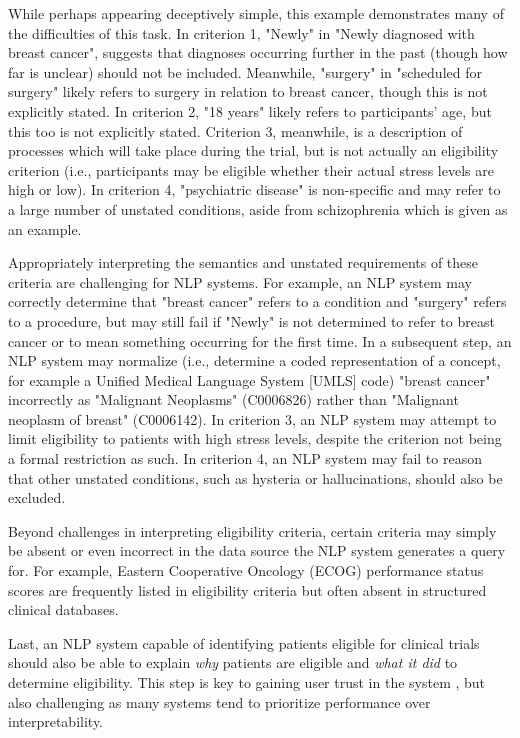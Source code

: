 \documentclass[../main.tex]{subfiles}
\begin{document}
\noindent While perhaps appearing deceptively simple, this example demonstrates many of the difficulties of this task. In criterion 1,  "Newly" in "Newly diagnosed with breast cancer", suggests that diagnoses occurring further in the past (though how far is unclear) should not be included. Meanwhile, "surgery" in "scheduled for surgery" likely refers to surgery in relation to breast cancer, though this is not explicitly stated. In criterion 2, "18 years" likely refers to participants' age, but this too is not explicitly stated. Criterion 3, meanwhile, is a description of processes which will take place during the trial, but is not actually an eligibility criterion (i.e., participants may be eligible whether their actual stress levels are high or low). In criterion 4, "psychiatric disease" is non-specific and may refer to a large number of unstated conditions, aside from schizophrenia which is given as an example.

Appropriately interpreting the semantics and unstated requirements of these criteria are challenging for NLP systems. For example, an NLP system may correctly determine that "breast cancer" refers to a condition and "surgery" refers to a procedure, but may still fail if "Newly" is not determined to refer to breast cancer or to mean something occurring for the first time. In a subsequent step, an NLP system may normalize (i.e., determine a coded representation of a concept, for example a Unified Medical Language System [UMLS] code) "breast cancer" incorrectly as "Malignant Neoplasms" (C0006826) rather than "Malignant neoplasm of breast" (C0006142). In criterion 3, an NLP system may attempt to limit eligibility to patients with high stress levels, despite the criterion not being a formal restriction as such. In criterion 4, an NLP system may fail to reason that other unstated conditions, such as hysteria or hallucinations, should also be excluded.

Beyond challenges in interpreting eligibility criteria, certain criteria may simply be absent or even incorrect in the data source the NLP system generates a query for. For example, Eastern Cooperative Oncology (ECOG) performance status scores \cite{sok2019objective} are frequently listed in eligibility criteria but often absent in structured clinical databases.

Last, an NLP system capable of identifying patients eligible for clinical trials should also be able to explain \textit{why} patients are eligible and \textit{what it did} to determine eligibility. This step is key to gaining user trust in the system \cite{lundberg2018explainable, jermutus2022influences}, but also challenging as many systems tend to prioritize performance over interpretability.
\end{document}
